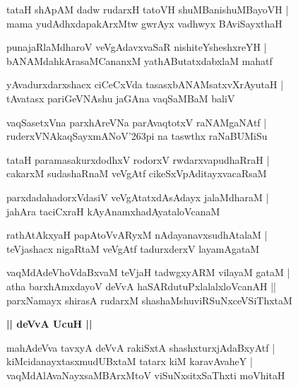 \documentclass[twoside,12pt,openright]{book}
\def\S{\char'263}
\newcounter{shloka}[chapter]
\def\uvaca#1{\centerline{{\large\textbf{#1}}}}
\begin{document}
\begin{shloka}%
tataH shApAM dadw rudarxH tatoVH shuMBanishuMBayoVH |\\
mama yudAdhxdapakArxMtw gwrAyx vadhwyx BAviSayxthaH 
\end{shloka}

\begin{shloka}%
punajaRlaMdharoV veVgAdavxvaSaR nishiteYsheshxreYH |\\
bANAMdahkArasaMCananxM yathAButatxdabxlaM mahatf
\end{shloka}

\begin{shloka}%
yAvadurxdarxshacx ciCeCxVda tasasxbANAMsatxvXrAyutaH |\\
tAvatasx pariGeVNAshu jaGAna vaqSaMBaM baliV 
\end{shloka}

\begin{shloka}%
vaqSasetxVna parxhAreVNa parAvaqtotxV raNAMgaNAtf |\\
ruderxVNAkaqSayxmANoV\S pi na taswthx raNaBUMiSu 
\end{shloka}

\begin{shloka}%
tataH paramasakurxdodhxV rodorxV rwdarxvapudhaRraH |\\
cakarxM sudashaRnaM veVgAtf cikeSxVpAditayxvacaRsaM 
\end{shloka}

\begin{shloka}%
parxdadahadorxVdasiV veVgAtatxdAsAdayx jalaMdharaM |\\
jahAra taciCxraH kAyAnamxhadAyataloVcanaM 
\end{shloka}

\begin{shloka}%
rathAtAkxyaH papAtoVvARyxM nAdayanavxsudhAtalaM |\\
teVjashacx nigaRtaM veVgAtf tadurxderxV layamAgataM 
\end{shloka}

\begin{shloka}%
vaqMdAdeVhoVdaBxvaM teVjaH tadwgxyARM vilayaM gataM |\\
atha barxhAmxdayoV deVvA haSARdutuPxlalalxloVcanAH ||\\
parxNamayx shirasA rudarxM shashaMshuviRSuNxceVSiThxtaM 
\end{shloka}

\uvaca{|| deVvA UcuH ||}

\begin{shloka}%
mahAdeVva tavxyA deVvA rakiSxtA shashxturxjAdaBxyAtf |\\
kiMcidanayxtasxmudUBxtaM tatarx kiM karavAvaheY |\\
vaqMdAlAvaNayxsaMBArxMtoV viSuNxsitxSaThxti moVhitaH 
\end{shloka}
\end{document}
